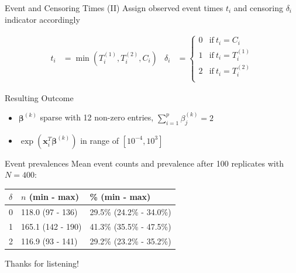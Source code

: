\documentclass{beamer}
\providecommand{\tightlist}{%
  \setlength{\itemsep}{0pt}\setlength{\parskip}{0pt}}
\begin{document}
\begin{frame}{Event and Censoring Times (II)}
\protect\hypertarget{event-and-censoring-times-ii}{}
Assign observed event times \(t_i\) and censoring \(\delta_i\) indicator
accordingly

\begin{align*}
t_i &= \min(T_i^{(1)}, T_i^{(2)}, C_i) & 
\delta_i &= \begin{cases}
  0 & \text{if}\ t_i = C_i \\
  1 & \text{if}\ t_i = T_i^{(1)} \\
  2 & \text{if}\ t_i = T_i^{(2)} \\
  \end{cases}
\end{align*}
\end{frame}

\begin{frame}{Resulting Outcome}
\protect\hypertarget{resulting-outcome}{}
\begin{itemize}
\tightlist
\item
  \(\pmb{\beta}^{(k)}\) sparse with 12 non-zero entries,
  \(\sum_{i = 1}^p \beta^{(k)}_j = 2\)
\end{itemize}

\begin{itemize}
\tightlist
\item
  \(\exp(\mathbf{x}^{T}_i\pmb{\beta}^{(k)})\) in range of
  \([10^{-4}, 10^{3}]\)
\end{itemize}

\begin{block}{Event prevalences}
\protect\hypertarget{event-prevalences}{}
Mean event counts and prevalence after 100 replicates with \(N = 400\):

\begin{table}
\centering
\begin{tabular}{l|l|l}
\hline
$\delta$ & $n$ (min - max) & \% (min - max)  \\
\hline
0 & 118.0 (97 - 136) & 29.5\% (24.2\% - 34.0\%)\\
\hline
1 & 165.1 (142 - 190) & 41.3\% (35.5\% - 47.5\%)\\
\hline
2 & 116.9 (93 - 141) & 29.2\% (23.2\% - 35.2\%)\\
\hline
\end{tabular}
\end{table}
\end{block}
\end{frame}

\begin{frame}{Thanks for listening!}
\protect\hypertarget{thanks-for-listening}{}
\end{frame}
\end{document}
